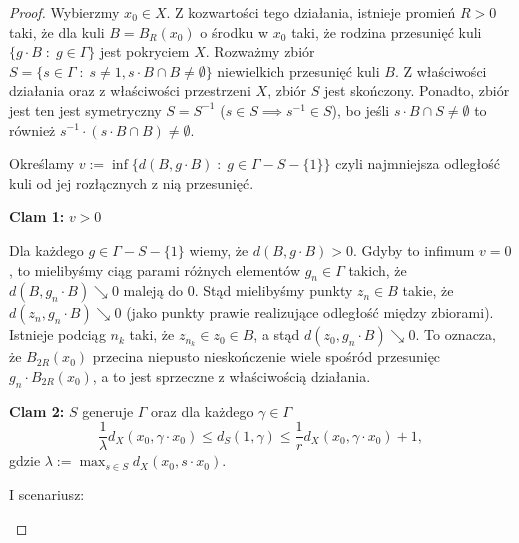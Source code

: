 \begin{proof}
  Wybierzmy $x_0\in X$. Z kozwartości tego działania, istnieje promień $R>0$ taki, że dla kuli $B=B_R(x_0)$ o środku w $x_0$ taki, że rodzina przesunięć kuli $\{g\cdot B\;:\; g\in\Gamma\}$ jest pokryciem $X$. Rozważmy zbiór $S=\{s\in\Gamma\;:\;s\neq1,s\cdot B\cap B\neq \emptyset\}$ niewielkich przesunięć kuli $B$. Z właściwości działania oraz z właściwości przestrzeni $X$, zbiór $S$ jest skończony. Ponadto, zbiór jest ten jest symetryczny $S=S^{-1}$ ($s\in S\implies s^{-1}\in S$), bo jeśli $s\cdot B\cap S\neq \emptyset$ to również $s^{-1}\cdot (s\cdot B\cap B)\neq \emptyset$.

  Określamy $v:=\inf\{d(B, g\cdot B)\;:\;g\in \Gamma-S-\{1\}\}$ czyli najmniejsza odległość kuli od jej rozłącznych z nią przesunięć.

  \textbf{Clam 1:} $v>0$

  Dla każdego $g\in\Gamma-S-\{1\}$ wiemy, że $d(B, g\cdot B)>0$. Gdyby to infimum $v=0$, to mielibyśmy ciąg parami różnych elementów $g_n\in\Gamma$ takich, że $d(B, g_n\cdot B)\searrow 0$ maleją do $0$. Stąd mielibyśmy punkty $z_n\in B$ takie, że $d(z_n, g_n\cdot B)\searrow 0$ (jako punkty prawie realizujące odległość między zbiorami). Istnieje podciąg $n_k$ taki, że $z_{n_k}\in z_0\in B$, a stąd $d(z_0, g_n\cdot B)\searrow 0$. To oznacza, że $B_{2R}(x_0)$ przecina niepusto nieskończenie wiele spośród przesunięc $g_n\cdot B_{2R}(x_0)$, a to jest sprzeczne z właściwością działania.

  \textbf{Clam 2:} $S$ generuje $\Gamma$ oraz dla każdego $\gamma\in\Gamma$
  $$\frac{1}{\lambda}d_X(x_0, \gamma\cdot x_0)\leq d_S(1, \gamma)\leq\frac{1}{r}d_X(x_0,\gamma\cdot x_0)+1,$$
  gdzie $\lambda:=\max_{s\in S}d_X(x_0, s\cdot x_0)$.

  I scenariusz:

  \begin{center}
\end{center}
\end{proof}
